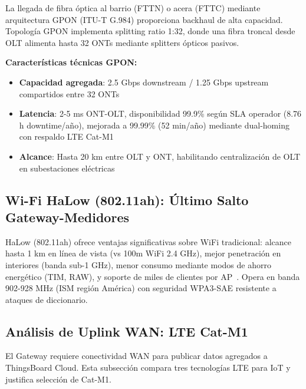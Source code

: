La llegada de fibra óptica al barrio (FTTN) o acera (FTTC) mediante arquitectura GPON (ITU-T G.984) proporciona backhaul de alta capacidad. Topología GPON implementa splitting ratio 1:32, donde una fibra troncal desde OLT alimenta hasta 32 ONTs mediante splitters ópticos pasivos.

\textbf{Características técnicas GPON:}
\begin{itemize}
    \item \textbf{Capacidad agregada}: 2.5 Gbps downstream / 1.25 Gbps upstream compartidos entre 32 ONTs
    \item \textbf{Latencia}: 2-5 ms ONT-OLT, disponibilidad 99.9\% según SLA operador (8.76 h downtime/año), mejorada a 99.99\% (52 min/año) mediante dual-homing con respaldo LTE Cat-M1
    \item \textbf{Alcance}: Hasta 20 km entre OLT y ONT, habilitando centralización de OLT en subestaciones eléctricas
\end{itemize}

\subsection{Wi-Fi HaLow (802.11ah): Último Salto Gateway-Medidores}

HaLow (802.11ah) ofrece ventajas significativas sobre WiFi tradicional: alcance hasta 1 km en línea de vista (vs 100m WiFi 2.4 GHz), mejor penetración en interiores (banda sub-1 GHz), menor consumo mediante modos de ahorro energético (TIM, RAW), y soporte de miles de clientes por AP~\cite{ieee80211ah2020,halowVsLoRaWANComparison2023}. Opera en banda 902-928 MHz (ISM región América) con seguridad WPA3-SAE resistente a ataques de diccionario.

\subsection{Análisis de Uplink WAN: LTE Cat-M1}

El Gateway requiere conectividad WAN para publicar datos agregados a ThingsBoard Cloud. Esta subsección compara tres tecnologías LTE para IoT y justifica selección de Cat-M1.

